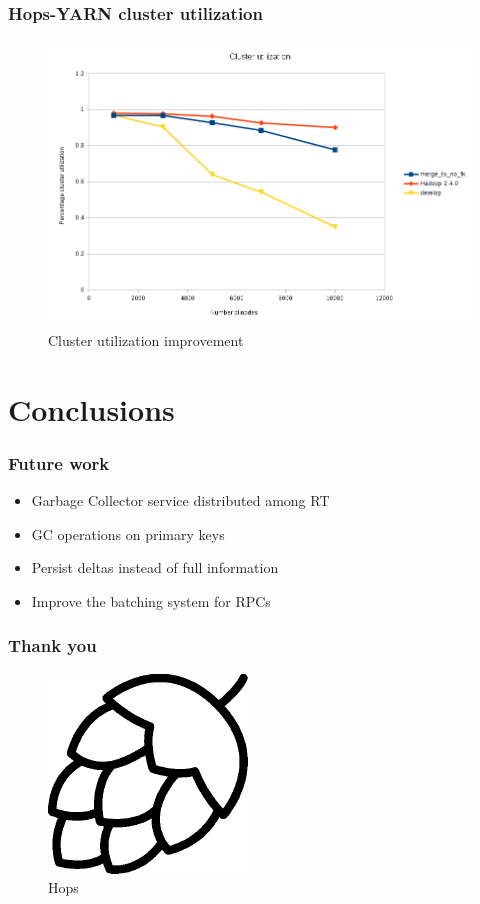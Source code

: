 \documentclass{beamer}
\begin{document}
\begin{frame}
\frametitle{Hops-YARN cluster utilization}

\begin{figure}
\centering
\includegraphics[scale=0.4]{resources/hopsyarn_cluster_util.png}
\caption{Cluster utilization improvement}
\end{figure}
\end{frame}

\section{Conclusions}
\begin{frame}
\frametitle{Future work}

\begin{itemize}
\item Garbage Collector service distributed among RT
\item GC operations on primary keys
\item Persist deltas instead of full information
\item Improve the batching system for RPCs
\end{itemize}
\end{frame}

\begin{frame}
\frametitle{Thank you}

\begin{figure}
\centering
\includegraphics[scale=0.2]{resources/hops_logo.png}
\caption*{Hops}
\end{figure}

\end{frame}
\end{document}
